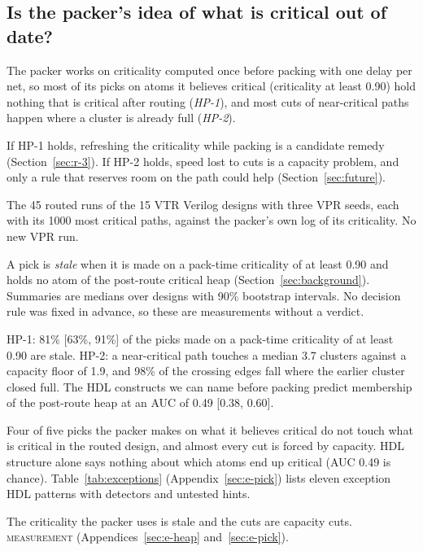 \subsection{Is the packer's idea of what is critical out of date?}
\label{sec:r-heap}

 The packer works on criticality computed once before packing with one delay per net, so most of its picks on atoms it believes critical (criticality at least 0.90) hold nothing that is critical after routing (\emph{HP-1}), and most cuts of near-critical paths happen where a cluster is already full (\emph{HP-2}).

 If HP-1 holds, refreshing the criticality while packing is a candidate remedy (Section~\ref{sec:r-3}). If HP-2 holds, speed lost to cuts is a capacity problem, and only a rule that reserves room on the path could help (Section~\ref{sec:future}).

 The 45 routed runs of the 15 VTR Verilog designs with three VPR seeds, each with its 1000 most critical paths, against the packer's own log of its criticality. No new VPR run.

 A pick is \emph{stale} when it is made on a pack-time criticality of at least 0.90 and holds no atom of the post-route critical heap (Section~\ref{sec:background}). Summaries are medians over designs with 90\% bootstrap intervals. No decision rule was fixed in advance, so these are measurements without a verdict.

 HP-1: 81\% [63\%, 91\%] of the picks made on a pack-time criticality of at least 0.90 are stale. HP-2: a near-critical path touches a median 3.7 clusters against a capacity floor of 1.9, and 98\% of the crossing edges fall where the earlier cluster closed full. The HDL constructs we can name before packing predict membership of the post-route heap at an AUC of 0.49 [0.38, 0.60].

 Four of five picks the packer makes on what it believes critical do not touch what is critical in the routed design, and almost every cut is forced by capacity. HDL structure alone says nothing about which atoms end up critical (AUC 0.49 is chance). Table~\ref{tab:exceptions} (Appendix~\ref{sec:e-pick}) lists eleven exception HDL patterns with detectors and untested hints.

 The criticality the packer uses is stale and the cuts are capacity cuts. \textsc{measurement} (Appendices~\ref{sec:e-heap} and~\ref{sec:e-pick}).

